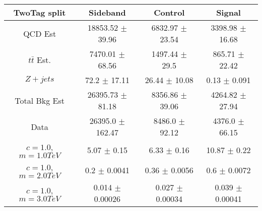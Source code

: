\begin{footnotesize} 
\begin{tabular}{c|c|c|c} 
TwoTag split & Sideband & Control & Signal \\ 
\hline\hline 
QCD Est & 18853.52 $\pm$ 39.96 & 6832.97 $\pm$ 23.54 & 3398.98 $\pm$ 16.68\\ 
$t\bar{t}$ Est.  & 7470.01 $\pm$ 68.56 & 1497.44 $\pm$ 29.5 & 865.71 $\pm$ 22.42\\ 
$Z+jets$ & 72.2 $\pm$ 17.11 & 26.44 $\pm$ 10.08 & 0.13 $\pm$ 0.091\\ 
Total Bkg Est & 26395.73 $\pm$ 81.18 & 8356.86 $\pm$ 39.06 & 4264.82 $\pm$ 27.94\\ 
Data & 26395.0 $\pm$ 162.47 & 8486.0 $\pm$ 92.12 & 4376.0 $\pm$ 66.15\\ 
$c=1.0$,$m=1.0TeV$ & 5.07 $\pm$ 0.15 & 6.33 $\pm$ 0.16 & 10.87 $\pm$ 0.22\\ 
$c=1.0$,$m=2.0TeV$ & 0.2 $\pm$ 0.0041 & 0.36 $\pm$ 0.0056 & 0.6 $\pm$ 0.0072\\ 
$c=1.0$,$m=3.0TeV$ & 0.014 $\pm$ 0.00026 & 0.027 $\pm$ 0.00034 & 0.039 $\pm$ 0.00041\\ 
\hline\hline 
\end{tabular} 
\end{footnotesize} 
\newline 
